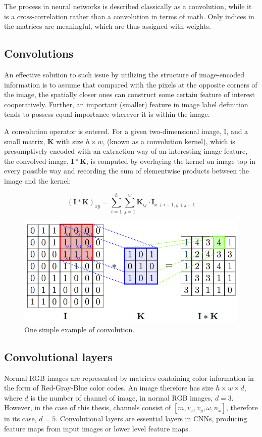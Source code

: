     The process in neural networks is described classically as a convolution, while it is a cross-correlation rather than a convolution in terms of math. Only indices in the matrices are meaningful, which are thus assigned with weights. 

    \subsection{Convolutions}
    An effective solution to such issue by utilizing the structure of image-encoded information is to assume that compared with the pixels at the opposite corners of the image, the spatially closer ones can construct some certain feature of interest cooperatively. Further, an important (smaller) feature in image label definition tends to possess equal importance wherever it is within the image. 
    
    A convolution operator is entered. For a given two-dimensional image, I, and a small matrix, $\pmb{K}$ with size $h \times w$, (known as a convolution kernel), which is presumptively encoded with an extraction way of an interesting image feature, the convolved image, $\pmb{I} * \pmb{K}$, is computed by overlaying the kernel on image top  in every possible way and recording the sum of elementwise products between the image and the kernel:

    \begin{equation}
        (\pmb{I} * \pmb{K})_{xy} = \sum_{i=1}^{h}\sum_{j=1}^{w} \pmb{K}_{ij}\cdot \pmb{I}_{x+i-1, y+j-1}
    \end{equation}

    \begin{figure}[!h]
        \centering
        \includegraphics[scale=1.3]{Figures/convolve.png}
        \caption{One simple example of convolution.}
        \label{con}
    \end{figure}

    \subsection{Convolutional layers}
    Normal RGB images are represented by matrices containing color information in the form of Red-Gray-Blue color codes. An image therefore has size $h\times w \times d$, where $d$ is the number of channel of image, in normal RGB images, $d=3$. However, in the case of this thesis, channels consist of $[m, v_x, v_y, \omega, n_x]$, therefore in its case, $d=5$. Convolutional layers are essential layers in CNNs, producing feature maps from input images or lower level feature maps. 

